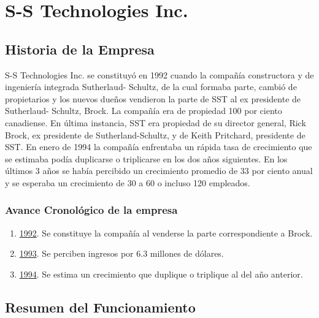 \chapter{S-S Technologies Inc.}

\section{Historia de la Empresa}
	S-S Technologies Inc. se constituy\'{o} en 1992 cuando la  compa\~{n}\'{i}a constructora y de ingenier\'{i}a integrada Sutherlaud- Schultz, de la cual formaba parte, cambi\'{o} de propietarios y los nuevos due\~{n}os vendieron la parte de SST al ex presidente de Sutherlaud- Schultz, Brock. La compa\~{n}\'{i}a era de  propiedad 100 por ciento canadiense. En \'{u}ltima instancia, SST era propiedad de su director general, Rick Brock, ex presidente de Sutherland-Schultz, y de Keith Pritchard, presidente de SST. 
	En enero de 1994 la compa\~{n}\'{i}a enfrentaba un r\'{a}pida tasa de crecimiento que se estimaba pod\'{i}a duplicarse o triplicarse en los dos a\~{n}os siguientes. En los \'{u}ltimos 3 a\~{n}os se hab\'{i}a percibido un crecimiento promedio de 33 por ciento anual y se esperaba un crecimiento de 30 a 60 o incluso 120 empleados.

	\subsection{Avance Cronol\'{o}gico de la empresa}
	\begin{enumerate}
		\item \underline{1992}. Se constituye la compa\~{n}\'{i}a al venderse la parte correspondiente a Brock. 
		\item \underline{1993}. Se perciben ingresos por 6.3 millones de d\'{o}lares.
		\item \underline{1994}. Se estima un crecimiento que duplique o triplique al del a\~{n}o anterior.
	\end{enumerate}

\section{Resumen del Funcionamiento}

